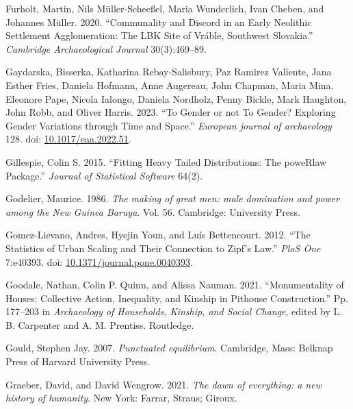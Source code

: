 \documentclass[
  12pt,
]{book}
\newlength{\cslhangindent}
\newlength{\cslentryspacingunit} %
\newenvironment{CSLReferences}[2] %
 {%
  \setlength{\parindent}{0pt}
  \ifodd #1
  \let\oldpar\par
  \def\par{\hangindent=\cslhangindent\oldpar}
  \fi
  \setlength{\parskip}{#2\cslentryspacingunit}
 }%
 {}
\begin{document}
\begin{CSLReferences}{1}{0}
\leavevmode{}%
Furholt, Martin, Nils Müller-Scheeßel, Maria Wunderlich, Ivan Cheben, and Johannes Müller. 2020. {``Communality and Discord in an Early Neolithic Settlement Agglomeration: The LBK Site of Vráble, Southwest Slovakia.''} \emph{Cambridge Archaeological Journal} 30(3):469--89.

\leavevmode{}%
Gaydarska, Bisserka, Katharina Rebay-Salisbury, Paz Ramirez Valiente, Jana Esther Fries, Daniela Hofmann, Anne Augereau, John Chapman, Maria Mina, Eleonore Pape, Nicola Ialongo, Daniela Nordholz, Penny Bickle, Mark Haughton, John Robb, and Oliver Harris. 2023. {``To Gender or not To Gender? Exploring Gender Variations through Time and Space.''} \emph{European journal of archaeology} 128. doi: \href{https://doi.org/10.1017/eaa.2022.51}{10.1017/eaa.2022.51}.

\leavevmode{}%
Gillespie, Colin S. 2015. {``Fitting Heavy Tailed Distributions: The poweRlaw Package.''} \emph{Journal of Statistical Software} 64(2).

\leavevmode{}%
Godelier, Maurice. 1986. \emph{The making of great men: male domination and power among the New Guinea Baruya}. Vol. 56. Cambridge: University Press.

\leavevmode{}%
Gomez-Lievano, Andres, Hyejin Youn, and Luís Bettencourt. 2012. {``The Statistics of Urban Scaling and Their Connection to Zipf{'}s Law.''} \emph{PloS One} 7:e40393. doi: \href{https://doi.org/10.1371/journal.pone.0040393}{10.1371/journal.pone.0040393}.

\leavevmode{}%
Goodale, Nathan, Colin P. Quinn, and Alissa Nauman. 2021. {``Monumentality of Houses: {Collective} Action, Inequality, and Kinship in Pithouse Construction.''} Pp. 177--203 in \emph{Archaeology of {Households}, {Kinship}, and {Social Change}}, edited by L. B. Carpenter and A. M. Prentiss. {Routledge}.

\leavevmode{}%
Gould, Stephen Jay. 2007. \emph{Punctuated equilibrium}. Cambridge, Mass: Belknap Press of Harvard University Press.

\leavevmode{}%
Graeber, David, and David Wengrow. 2021. \emph{The dawn of everything: a new history of humanity}. New York: Farrar, Straus; Giroux.


\end{CSLReferences}
\end{document}
